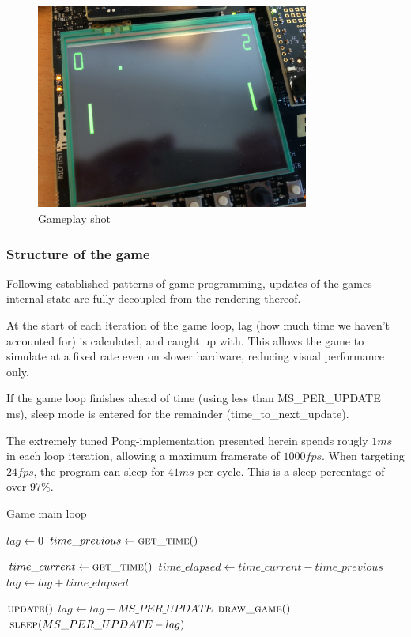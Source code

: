 \begin{figure}[H]
\centering
\includegraphics[width=0.8\textwidth]{figures/gameplay.jpg}
\caption{Gameplay shot}

\end{figure}

\subsubsection{Structure of the game}

Following established patterns of game programming, updates of the games
internal state are fully decoupled from the rendering thereof.

At the start of each iteration of the game loop, lag (how much time we haven't
accounted for) is calculated, and caught up with.
This allows the game to simulate at a fixed rate even on slower hardware,
reducing visual performance only.

If the game loop finishes ahead of time (using less than MS\_PER\_UPDATE ms),
sleep mode is entered for the remainder (time\_to\_next\_update).

The extremely tuned Pong-implementation presented herein spends rougly $ 1 ms $
in each loop iteration, allowing a maximum framerate of $ 1000 fps $.
When targeting $ 24 fps $, the program can sleep for $ 41 ms $ per cycle.
This is a sleep percentage of over $ 97 \% $.

\begin{algorithm}
  \caption{Game main loop}
  \begin{algorithmic}
    \State $lag \gets 0$
    \State $time\_previous \gets \Call{get\_time}{\null}$

    \Loop
      \State $time\_current \gets \Call{get\_time}{\null}$
      \State $time\_elapsed \gets time\_current - time\_previous$
      \State $lag \gets lag + time\_elapsed$

        \State $\Call{update}{\null}$
        \State $lag \gets lag - MS\_PER\_UPDATE$
      \EndWhile
      \State $\Call{draw\_game}{\null}$
      \State $\Call{sleep}{MS\_PER\_UPDATE - lag}$
    \EndLoop
  \end{algorithmic}
\end{algorithm}

